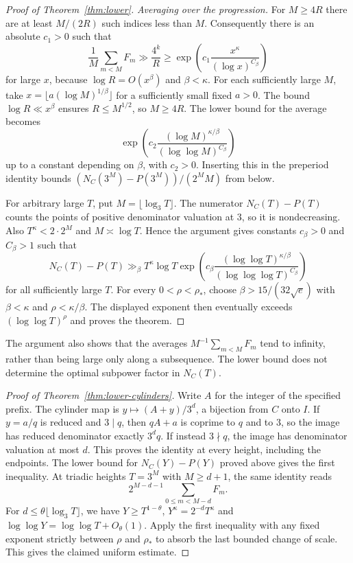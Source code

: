 \begin{proof}[Proof of Theorem~\ref{thm:lower}]
\smallskip
\noindent\emph{Averaging over the progression.}
For \(M\ge4R\) there are at least \(M/(2R)\) such indices less
than \(M\). Consequently there is an absolute \(c_1>0\) such that
\[
 \frac1M\sum_{m<M}F_m\gg \frac{4^k}{R}
     \ge\exp\left(c_1\frac{x^\kappa}{(\log x)^{C_\beta}}\right)
\]
for large \(x\), because \(\log R=O(x^\beta)\) and \(\beta<\kappa\).
For each sufficiently large \(M\), take
\(x=\lfloor a(\log M)^{1/\beta}\rfloor\) for a sufficiently small
fixed \(a>0\). The bound \(\log R\ll x^\beta\) ensures \(R\le M^{1/2}\),
so \(M\ge4R\). The lower bound for the average becomes
\[
 \exp\left(c_2\frac{(\log M)^{\kappa/\beta}}
                        {(\log\log M)^{C_\beta}}\right)
\]
up to a constant depending on \(\beta\), with \(c_2>0\). Inserting this in
the preperiod identity bounds \((N_C(3^M)-P(3^M))/(2^M M)\) from below.

For arbitrary large \(T\), put \(M=\lfloor\log_3T\rfloor\).
The numerator \(N_C(T)-P(T)\) counts the points of positive denominator
valuation at \(3\), so it is nondecreasing. Also
\(T^\kappa<2\cdot 2^M\) and \(M\asymp\log T\). Hence the argument gives
constants \(c_\beta>0\) and \(C_\beta>1\) such that
\[
 N_C(T)-P(T)\gg_\beta T^\kappa\log T
 \exp\left(c_\beta\frac{(\log\log T)^{\kappa/\beta}}
                             {(\log\log\log T)^{C_\beta}}\right)
\]
for all sufficiently large \(T\). For every \(0<\rho<\rho_*\), choose
\(\beta>15/(32\sqrt e)\) with \(\beta<\kappa\) and \(\rho<\kappa/\beta\).
The displayed exponent then eventually exceeds \((\log\log T)^\rho\)
and proves the theorem.
\end{proof}

The argument also shows that the averages
\(M^{-1}\sum_{m<M}F_m\) tend to infinity, rather than being large
only along a subsequence. The lower bound does not determine the
optimal subpower factor in \(N_C(T)\).

\begin{proof}[Proof of Theorem~\ref{thm:lower-cylinders}]
Write \(A\) for the integer of the specified prefix. The cylinder map
is \(y\mapsto (A+y)/3^d\), a bijection from \(C\) onto \(I\).
If \(y=a/q\) is reduced and \(3\mid q\), then \(qA+a\) is coprime to
\(q\) and to \(3\), so the image has reduced denominator exactly
\(3^d q\). If instead \(3\nmid q\), the image has denominator
valuation at most \(d\). This proves the identity at every height,
including the endpoints. The lower bound for \(N_C(Y)-P(Y)\) proved
above gives the first inequality. At triadic heights \(T=3^M\)
with \(M\ge d+1\), the same identity reads
\[
 2^{M-d-1}\sum_{0\le m<M-d}F_m .
\]
For \(d\le\theta\lfloor\log_3 T\rfloor\), we have
\(Y\ge T^{1-\theta}\), \(Y^\kappa=2^{-d}T^\kappa\) and
\(\log\log Y=\log\log T+O_\theta(1)\). Apply the first inequality
with any fixed exponent strictly between \(\rho\) and \(\rho_*\)
to absorb the last bounded change of scale. This gives the claimed
uniform estimate.
\end{proof}
